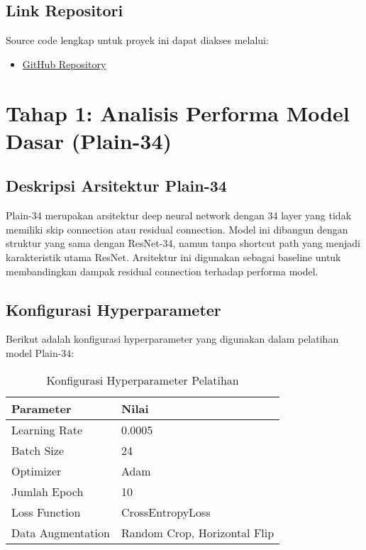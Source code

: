 \documentclass[11pt,a4paper]{article}
\begin{document}
\subsection{Link Repositori}

Source code lengkap untuk proyek ini dapat diakses melalui:

\begin{itemize}
    \item \href{https://github.com/shrxxxk/Resnet-Exploration_300Gecs.git}{GitHub Repository}
\end{itemize}

\section{Tahap 1: Analisis Performa Model Dasar (Plain-34)}

\subsection{Deskripsi Arsitektur Plain-34}

Plain-34 merupakan arsitektur deep neural network dengan 34 layer yang tidak memiliki skip connection atau residual connection. Model ini dibangun dengan struktur yang sama dengan ResNet-34, namun tanpa shortcut path yang menjadi karakteristik utama ResNet. Arsitektur ini digunakan sebagai baseline untuk membandingkan dampak residual connection terhadap performa model.

\subsection{Konfigurasi Hyperparameter}

Berikut adalah konfigurasi hyperparameter yang digunakan dalam pelatihan model Plain-34:

\begin{table}[H]
\centering
\caption{Konfigurasi Hyperparameter Pelatihan}
\label{tab:hyperparameter}
\begin{tabular}{ll}
\toprule
\textbf{Parameter} & \textbf{Nilai} \\
\midrule
Learning Rate & 0.0005 \\
Batch Size & 24 \\
Optimizer & Adam \\
Jumlah Epoch & 10 \\
Loss Function & CrossEntropyLoss \\
Data Augmentation & Random Crop, Horizontal Flip \\
\bottomrule
\end{tabular}
\end{table}
\end{document}
